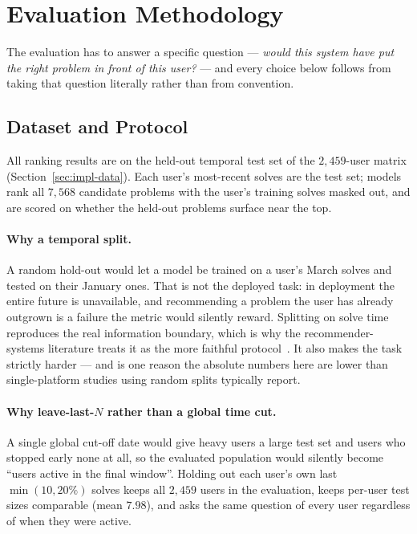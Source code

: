 \documentclass[12pt,a4paper]{article}
\begin{document}
\section[Evaluation Methodology \textnormal{\small(1,147 words)}]{Evaluation Methodology}
\label{sec:eval}

The evaluation has to answer a specific question --- \emph{would this system have put the
right problem in front of this user?} --- and every choice below follows from taking that
question literally rather than from convention.

\subsection{Dataset and Protocol}
All ranking results are on the held-out temporal test set of the $2{,}459$-user matrix
(Section~\ref{sec:impl-data}). Each user's most-recent solves are the test set; models
rank all $7{,}568$ candidate problems with the user's training solves masked out, and are
scored on whether the held-out problems surface near the top.

\paragraph{Why a temporal split.} A random hold-out would let a model be trained on a
user's March solves and tested on their January ones. That is not the deployed task: in
deployment the entire future is unavailable, and recommending a problem the user has
already outgrown is a failure the metric would silently reward. Splitting on solve time
reproduces the real information boundary, which is why the recommender-systems literature
treats it as the more faithful protocol~\cite{cremonesi2010}. It also makes the task
strictly harder --- and is one reason the absolute numbers here are lower than
single-platform studies using random splits typically report.

\paragraph{Why leave-last-$N$ rather than a global time cut.} A single global cut-off date
would give heavy users a large test set and users who stopped early none at all, so the
evaluated population would silently become ``users active in the final window''. Holding
out each user's own last $\min(10, 20\%)$ solves keeps all $2{,}459$ users in the
evaluation, keeps per-user test sizes comparable (mean $7.98$), and asks the same question
of every user regardless of when they were active.
\end{document}
